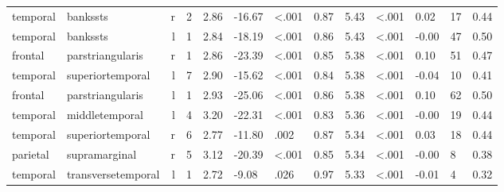 \documentclass{article}
\begin{document}
\begin{longtable}{llrR{1.3cm}R{1cm}R{1.3cm}R{1cm}R{1cm}R{1.3cm}R{1cm}R{1.8cm}R{1.3cm}R{1.8cm}}
  temporal &                  bankssts &    r &         2 &                  2.86 &           -16.67 &      \textless.001 &                               0.87 &                          5.43 &                   \textless.001 &   0.02 &     17 &      0.44 \\
  temporal &                  bankssts &    l &         1 &                  2.84 &           -18.19 &      \textless.001 &                               0.86 &                          5.43 &                   \textless.001 &  -0.00 &     47 &      0.50 \\
   frontal &          parstriangularis &    r &         1 &                  2.86 &           -23.39 &      \textless.001 &                               0.85 &                          5.38 &                   \textless.001 &   0.10 &     51 &      0.47 \\
  temporal &          superiortemporal &    l &         7 &                  2.90 &           -15.62 &      \textless.001 &                               0.84 &                          5.38 &                   \textless.001 &  -0.04 &     10 &      0.41 \\
   frontal &          parstriangularis &    l &         1 &                  2.93 &           -25.06 &      \textless.001 &                               0.86 &                          5.38 &                   \textless.001 &   0.10 &     62 &      0.50 \\
  temporal &            middletemporal &    l &         4 &                  3.20 &           -22.31 &      \textless.001 &                               0.83 &                          5.36 &                   \textless.001 &  -0.00 &     19 &      0.44 \\
  temporal &          superiortemporal &    r &         6 &                  2.77 &           -11.80 &               .002 &                               0.87 &                          5.34 &                   \textless.001 &   0.03 &     18 &      0.44 \\
  parietal &             supramarginal &    r &         5 &                  3.12 &           -20.39 &      \textless.001 &                               0.85 &                          5.34 &                   \textless.001 &  -0.00 &      8 &      0.38 \\
  temporal &        transversetemporal &    l &         1 &                  2.72 &            -9.08 &               .026 &                               0.97 &                          5.33 &                   \textless.001 &  -0.01 &      4 &      0.32 \\

\end{longtable}
\end{document}
